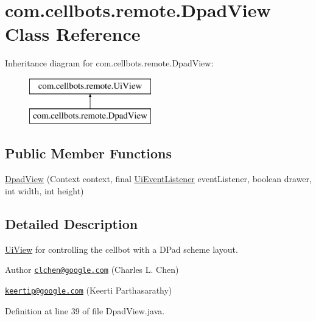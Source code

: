 \hypertarget{classcom_1_1cellbots_1_1remote_1_1_dpad_view}{\section{com.\-cellbots.\-remote.\-Dpad\-View Class Reference}
\label{classcom_1_1cellbots_1_1remote_1_1_dpad_view}
}
Inheritance diagram for com.\-cellbots.\-remote.\-Dpad\-View\-:\begin{figure}[H]
\begin{center}
\leavevmode
\includegraphics[height=2.000000cm]{classcom_1_1cellbots_1_1remote_1_1_dpad_view}
\end{center}
\end{figure}
\subsection*{Public Member Functions}
\begin{DoxyCompactItemize}
\item 
\hyperlink{classcom_1_1cellbots_1_1remote_1_1_dpad_view_ac8bd8831084dbef6628aa8960eccb621}{Dpad\-View} (Context context, final \hyperlink{interfacecom_1_1cellbots_1_1remote_1_1_ui_view_1_1_ui_event_listener}{Ui\-Event\-Listener} event\-Listener, boolean drawer, int width, int height)
\end{DoxyCompactItemize}


\subsection{Detailed Description}
\hyperlink{classcom_1_1cellbots_1_1remote_1_1_ui_view}{Ui\-View} for controlling the cellbot with a D\-Pad scheme layout.

\begin{DoxyAuthor}{Author}
\href{mailto:clchen@google.com}{\tt clchen@google.\-com} (Charles L. Chen) 

\href{mailto:keertip@google.com}{\tt keertip@google.\-com} (Keerti Parthasarathy) 
\end{DoxyAuthor}


Definition at line 39 of file Dpad\-View.\-java.




